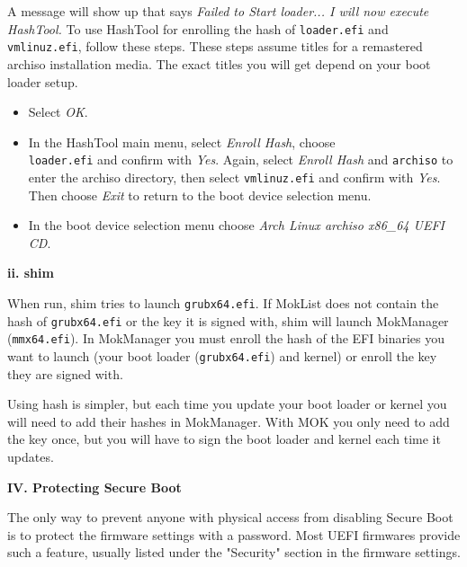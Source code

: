 \documentclass{exam-zh}
\begin{document}
A message will show up that says \textit{Failed to Start loader... I will now execute HashTool.} To use HashTool for enrolling the hash of \texttt{loader.efi} and \texttt{vmlinuz.efi}, follow these steps. These steps assume titles for a remastered archiso installation media. The exact titles you will get depend on your boot loader setup.

\begin{itemize}
\item Select \textit{OK}.

\item In the HashTool main menu, select \textit{Enroll Hash}, choose \texttt{\\loader.efi} and confirm with \textit{Yes}. Again, select \textit{Enroll Hash} and \texttt{archiso} to enter the archiso directory, then select \texttt{vmlinuz.efi} and confirm with \textit{Yes}. Then choose \textit{Exit} to return to the boot device selection menu.

\item In the boot device selection menu choose \textit{Arch Linux archiso x86\_64 UEFI CD}.
\end{itemize}

\textbf{ii. shim}

When run, shim tries to launch \texttt{grubx64.efi}. If MokList does not contain the hash of \texttt{grubx64.efi} or the key it is signed with, shim will launch MokManager (\texttt{mmx64.efi}). In MokManager you must enroll the hash of the EFI binaries you want to launch (your boot loader (\texttt{grubx64.efi}) and kernel) or enroll the key they are signed with.

Using hash is simpler, but each time you update your boot loader or kernel you will need to add their hashes in MokManager. With MOK you only need to add the key once, but you will have to sign the boot loader and kernel each time it updates.

\par
\endgroup

\textbf{IV. Protecting Secure Boot}

The only way to prevent anyone with physical access from disabling Secure Boot is to protect the firmware settings with a password. Most UEFI firmwares provide such a feature, usually listed under the "Security" section in the firmware settings.
\end{document}
